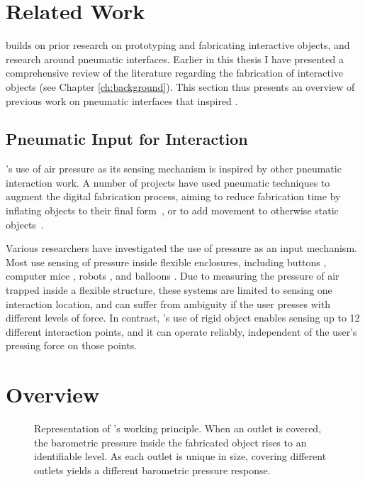 	\section{Related Work}
		\at builds on prior research on prototyping and fabricating interactive
		objects, and research around pneumatic interfaces. Earlier in this thesis I
		have presented a comprehensive review of the literature regarding the
		fabrication of interactive objects (see Chapter \ref{ch:background}). This
		section thus presents an overview of previous work on pneumatic interfaces
		that inspired \at.

		\subsection{Pneumatic Input for Interaction}
			\at's use of air pressure as its sensing mechanism is inspired by other
			pneumatic interaction work. A number of projects have used pneumatic
			techniques to augment the digital fabrication process, aiming to reduce
			fabrication time by inflating objects to their final
			form~\cite{Yamaoka:2017, Sareen:2017, Ou:2016}, or to add movement to
			otherwise static objects~\cite{Niiyama:2015, Yao:2013, Niiyama:2015a}.
			
			Various researchers have investigated the use of pressure as an input
			mechanism. Most use sensing of pressure inside flexible enclosures,
			including buttons \cite{Harrison:2009, Vazquez:2015, Gohlke:2016},
			computer mice \cite{Kim:2008}, robots \cite{Slyper:2012}, and balloons
			\cite{Nakajima:2013}. Due to measuring the pressure of air trapped
			inside a flexible structure, these systems are limited to sensing one
			interaction location, and can suffer from ambiguity if the user presses
			with different levels of force. In contrast, \at's use of rigid object
			enables sensing up to 12 different interaction points, and it can operate
			reliably, independent of the user's pressing force on those points.

		\section{\at Overview}
			\begin{figure}[h]
				\centering
				\label{fig:bunny-touches}

				\caption{Representation of \at's working principle. When an outlet is
					covered, the barometric pressure inside the fabricated object rises to an
					identifiable level. As each outlet is unique in size, covering different
					outlets yields a different barometric pressure response.}
			\end{figure}

